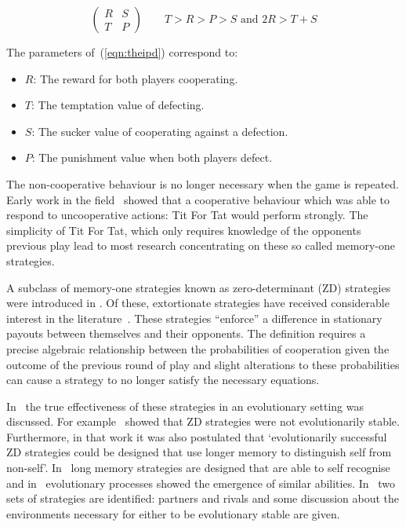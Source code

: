 \documentclass[a4paper]{article}
\begin{document}
\begin{equation}
    \begin{pmatrix}
        R & S \\
        T & P
    \end{pmatrix}
    \qquad
    T > R > P > S\text{ and }2 R > T + S
    \label{eqn:theipd}
\end{equation}

The parameters of~(\ref{eqn:theipd}) correspond to:

\begin{itemize}
    \item \(R\): The reward for both players cooperating.
    \item \(T\): The temptation value of defecting.
    \item \(S\): The sucker value of cooperating against a defection.
    \item \(P\): The punishment value when both players defect.
\end{itemize}

The non-cooperative behaviour is no longer necessary when the game is repeated.
Early work in the field~\cite{Axelrod1980, Axelrod1980a} showed that a cooperative behaviour
which was able to respond to uncooperative actions: Tit For Tat would perform
strongly. The simplicity of Tit For Tat, which only requires knowledge of the
opponents previous play lead to most research concentrating on these so called
memory-one strategies.

A subclass of memory-one strategies known as zero-determinant (ZD) strategies
were introduced in \cite{Press2012}. Of these, extortionate strategies have received
considerable interest in the literature~\cite{hilbe2015partners}. These
strategies ``enforce'' a difference in stationary payouts between themselves and
their opponents. The definition requires a precise algebraic relationship
between the probabilities of cooperation given the outcome of the previous round
of play and slight alterations to these probabilities can cause a strategy to no
longer satisfy the necessary equations.

In~\cite{adami2013evolutionary, hilbe2018partners, Hilbe2013, hilbe2013adaptive,
hilbe2015partners, ichinose2018zero, Moran1707} the true effectiveness of these
strategies in an evolutionary setting was discussed. For
example~\cite{adami2013evolutionary} showed that ZD strategies were not
evolutionarily stable. Furthermore, in that work it was also postulated that
`evolutionarily successful ZD strategies could be designed that use longer
memory to distinguish self from non-self'. In~\cite{lee2015art} long memory
strategies are designed that are able to self recognise and in~\cite{Moran1707}
evolutionary processes showed the emergence of similar abilities.
In~\cite{hilbe2018partners} two sets of strategies are identified: partners and
rivals and some discussion about the environments necessary for either to be
evolutionary stable are given.
\end{document}
